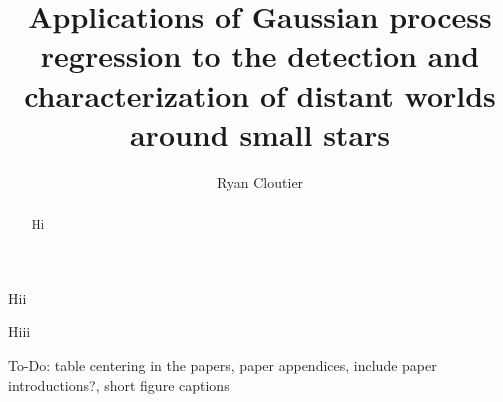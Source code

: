 \documentclass{ut-thesis}
\author{Ryan Cloutier}
\title{Applications of Gaussian process regression to the detection
and characterization of distant worlds around small stars}
\begin{document}
\begin{preliminary}

\maketitle

\begin{abstract}
  Hi
\end{abstract}


\begin{dedication}
  Hii
\end{dedication}
\newpage

\begin{acknowledgements}
  Hiii
\end{acknowledgements}
\newpage

\tableofcontents
\listoftables
\listoffigures

\end{preliminary}

To-Do: table centering in the papers, paper appendices, include paper introductions?, short figure captions
%
%
%
%





\end{document}

